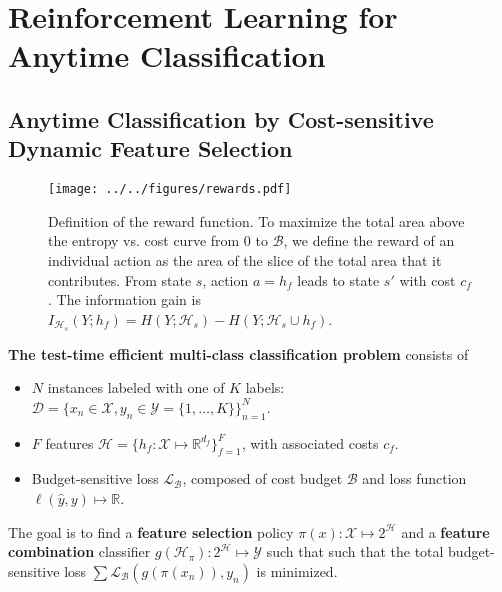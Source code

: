 \chapter{Reinforcement Learning for Anytime Classification}

\section{Anytime Classification by Cost-sensitive Dynamic Feature Selection}

\begin{figure}[ht]
\texttt{[image: ../../figures/rewards.pdf]}
\caption{
Definition of the reward function.
To maximize the total area above the entropy vs. cost curve from $0$ to $\mathcal{B}$, we define the reward of an individual action as the area of the slice of the total area that it contributes.
From state $s$, action $a = h_f$ leads to state $s'$ with cost $c_f$.
The information gain is $I_{\mathcal{H}_s}(Y; h_f) = H(Y; \mathcal{H}_s) - H(Y; \mathcal{H}_s \cup {h_f})$.
\label{fig:rewards}}
\end{figure}

\begin{mydef} \label{def:problem}
\textbf{The test-time efficient multi-class classification problem} consists of

\begin{itemize}
\item
$N$ instances labeled with one of $K$ labels: ${\mathcal{D} = \{x_n \in \mathcal{X}, y_n \in \mathcal{Y} = \{1, \dots, K\}\}_{n=1}^N}$.

\item
$F$ features $\mathcal{H} = \{h_f : \mathcal{X} \mapsto \mathbb{R}^{d_f} \}_{f=1}^F$, with associated costs $c_f$.

\item Budget-sensitive loss $\mathcal{L}_\mathcal{B}$, composed of cost budget $\mathcal{B}$ and loss function ${\ell(\hat{y}, y) \mapsto \mathbb{R}}$.
\end{itemize}

The goal is to find a \textbf{feature selection} policy $\pi(x): \mathcal{X} \mapsto 2^\mathcal{H}$ and a \textbf{feature combination} classifier $g(\mathcal{H}_\pi) : 2^\mathcal{H} \mapsto \mathcal{Y}$ such that such that the total budget-sensitive loss $\sum \mathcal{L}_\mathcal{B}(g(\pi(x_n)), y_n)$ is minimized.
\end{mydef}

